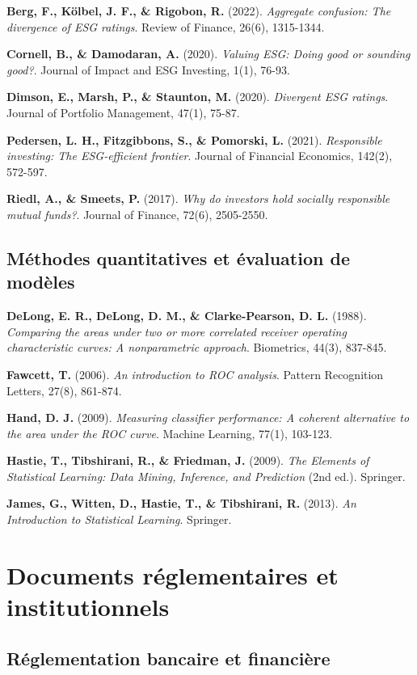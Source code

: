 \textbf{Berg, F., Kölbel, J. F., \& Rigobon, R.} (2022). \textit{Aggregate confusion: The divergence of ESG ratings}. Review of Finance, 26(6), 1315-1344.

\textbf{Cornell, B., \& Damodaran, A.} (2020). \textit{Valuing ESG: Doing good or sounding good?}. Journal of Impact and ESG Investing, 1(1), 76-93.

\textbf{Dimson, E., Marsh, P., \& Staunton, M.} (2020). \textit{Divergent ESG ratings}. Journal of Portfolio Management, 47(1), 75-87.

\textbf{Pedersen, L. H., Fitzgibbons, S., \& Pomorski, L.} (2021). \textit{Responsible investing: The ESG-efficient frontier}. Journal of Financial Economics, 142(2), 572-597.

\textbf{Riedl, A., \& Smeets, P.} (2017). \textit{Why do investors hold socially responsible mutual funds?}. Journal of Finance, 72(6), 2505-2550.

\subsection{Méthodes quantitatives et évaluation de modèles}

\textbf{DeLong, E. R., DeLong, D. M., \& Clarke-Pearson, D. L.} (1988). \textit{Comparing the areas under two or more correlated receiver operating characteristic curves: A nonparametric approach}. Biometrics, 44(3), 837-845.

\textbf{Fawcett, T.} (2006). \textit{An introduction to ROC analysis}. Pattern Recognition Letters, 27(8), 861-874.

\textbf{Hand, D. J.} (2009). \textit{Measuring classifier performance: A coherent alternative to the area under the ROC curve}. Machine Learning, 77(1), 103-123.

\textbf{Hastie, T., Tibshirani, R., \& Friedman, J.} (2009). \textit{The Elements of Statistical Learning: Data Mining, Inference, and Prediction} (2nd ed.). Springer.

\textbf{James, G., Witten, D., Hastie, T., \& Tibshirani, R.} (2013). \textit{An Introduction to Statistical Learning}. Springer.

\section{Documents réglementaires et institutionnels}

\subsection{Réglementation bancaire et financière}

